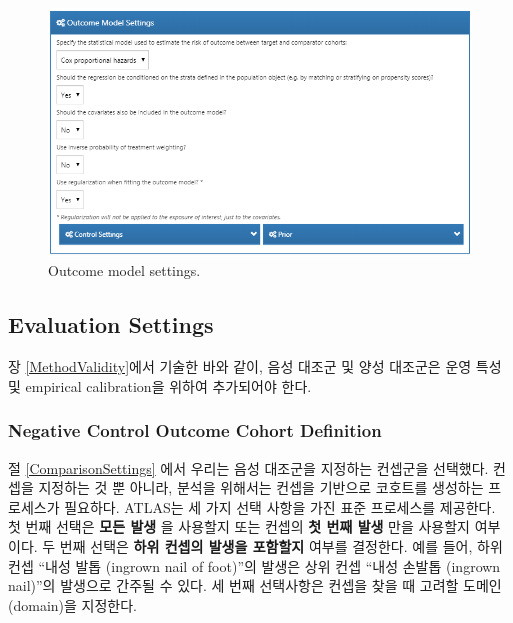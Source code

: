\documentclass[11pt]{book}
\theoremstyle{definition}
\theoremstyle{definition}
\theoremstyle{definition}
\theoremstyle{remark}
\begin{document}
\begin{figure}

{\centering \includegraphics[width=1\linewidth]{images/PopulationLevelEstimation/outcomeModelSettings} 

}

\caption{Outcome model settings.}\label{fig:outcomeModelSettings}
\end{figure}

\subsection{Evaluation Settings}\label{evaluationSettings}

장 \ref{MethodValidity}에서 기술한 바와 같이, 음성 대조군 및 양성
대조군은 운영 특성 및 empirical calibration을 위하여 추가되어야 한다.

\subsubsection*{Negative Control Outcome Cohort
Definition}\label{negative-control-outcome-cohort-definition}

절 \ref{ComparisonSettings} 에서 우리는 음성 대조군을 지정하는 컨셉군을
선택했다. 컨셉을 지정하는 것 뿐 아니라, 분석을 위해서는 컨셉을 기반으로
코호트를 생성하는 프로세스가 필요하다. ATLAS는 세 가지 선택 사항을 가진
표준 프로세스를 제공한다. 첫 번째 선택은 \textbf{모든 발생} 을 사용할지
또는 컨셉의 \textbf{첫 번째 발생} 만을 사용할지 여부이다. 두 번째 선택은
\textbf{하위 컨셉의 발생을 포함할지} 여부를 결정한다. 예를 들어, 하위
컨셉 ``내성 발톱 (ingrown nail of foot)''의 발생은 상위 컨셉 ``내성
손발톱 (ingrown nail)''의 발생으로 간주될 수 있다. 세 번째 선택사항은
컨셉을 찾을 때 고려할 도메인 (domain)을 지정한다.
\end{document}
